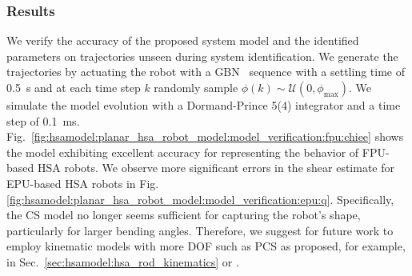 \subsubsection{Results}\label{ssub:hsamodel:planar_hsa_robot_model:model_verification:results}
We verify the accuracy of the proposed system model and the identified parameters on trajectories unseen during system identification. We generate the trajectories by actuating the robot with a \gls{GBN}~\cite{tulleken1990generalized} sequence with a settling time of \SI{0.5}{s} and at each time step $k$ randomly sample $\phi(k) \sim \mathcal{U}(0, \phi_\mathrm{max})$.
We simulate the model evolution with a Dormand-Prince 5(4) integrator and a time step of \SI{0.1}{ms}.
Fig.~\ref{fig:hsamodel:planar_hsa_robot_model:model_verification:fpu:chiee} shows the model exhibiting excellent accuracy for representing the behavior of FPU-based \gls{HSA} robots.
We observe more significant errors in the shear estimate for EPU-based \gls{HSA} robots in Fig.\ref{fig:hsamodel:planar_hsa_robot_model:model_verification:epu:q}. Specifically, the \gls{CS} model no longer seems sufficient for capturing the robot's shape, particularly for larger bending angles. Therefore, we suggest for future work to employ kinematic models with more \gls{DOF} such as \gls{PCS} as proposed, for example, in Sec.~\ref{sec:hsamodel:hsa_rod_kinematics} or \cite{renda2018discrete}.

